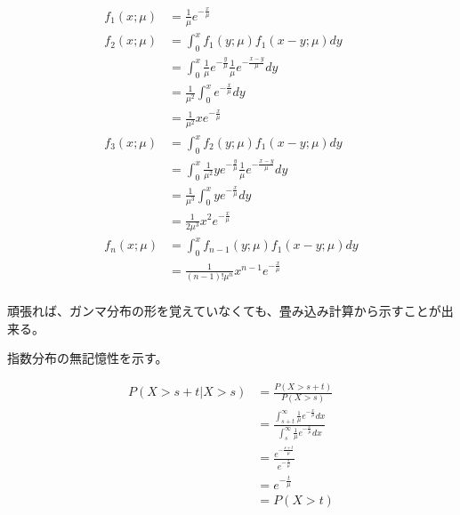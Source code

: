 \documentclass[a4paper, 10pt, dvipdfmx]{jlreq}
\begin{document}
\begin{align*}
    f_1(x;\mu) & =\frac{1}{\mu}e^{-\frac{x}{\mu}}                                                 \\
    f_2(x;\mu) & =\int_0^x{f_1(y;\mu)f_1(x-y;\mu)dy}                                              \\
               & =\int_0^x{\frac{1}{\mu}e^{-\frac{y}{\mu}}\frac{1}{\mu}e^{-\frac{x-y}{\mu}}dy}    \\
               & =\frac{1}{\mu^2}\int_0^x{e^{-\frac{x}{\mu}}dy}                                   \\
               & =\frac{1}{\mu^2}xe^{-\frac{x}{\mu}}                                              \\
    f_3(x;\mu) & =\int_0^x{f_2(y;\mu)f_1(x-y;\mu)dy}                                              \\
               & =\int_0^x{\frac{1}{\mu^2}ye^{-\frac{y}{\mu}}\frac{1}{\mu}e^{-\frac{x-y}{\mu}}dy} \\
               & =\frac{1}{\mu^3}\int_0^x{ye^{-\frac{x}{\mu}}dy}                                  \\
               & =\frac{1}{2\mu^3}x^2e^{-\frac{x}{\mu}}                                           \\
    f_n(x;\mu) & =\int_0^x{f_{n-1}(y;\mu)f_1(x-y;\mu)dy}                                          \\
               & =\frac{1}{(n-1)!\mu^n} x^{n-1} e^{-\frac{x}{\mu}}                                \\
\end{align*}

頑張れば、ガンマ分布の形を覚えていなくても、畳み込み計算から示すことが出来る。

指数分布の無記憶性を示す。

\begin{align*}
    P(X>s+t|X>s) & =\frac{P(X>s+t)}{P(X>s)}                                                                                         \\
                 & =\frac{\int_{s+t}^{\infty}\frac{1}{\mu}e^{-\frac{x}{\mu}}dx}{\int_{s}^{\infty}\frac{1}{\mu}e^{-\frac{x}{\mu}}dx} \\
                 & =\frac{e^{-\frac{s+t}{\mu}}}{e^{-\frac{s}{\mu}}}                                                                 \\
                 & =e^{-\frac{t}{\mu}}                                                                                              \\
                 & =P(X>t)                                                                                                          \\
\end{align*}
\end{document}
